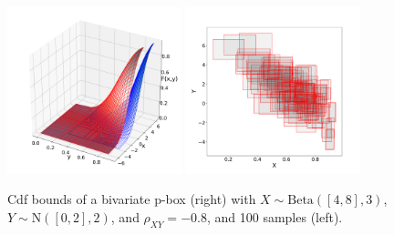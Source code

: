 \documentclass{juliacon}
\begin{document}
\begin{figure}[t!]
  \centering
  \includegraphics[width=0.45\textwidth]{../examples/JuliaCon/fig7/biv_cdf.pdf}\hfill
  \includegraphics[width=0.45\textwidth]{../examples/JuliaCon/fig7/samples.pdf}
  \caption{Cdf bounds of a bivariate p-box (right) with $X \sim \text{Beta}([4,8], 3)$, $Y \sim \text{N}([0,2], 2)$, and $\rho_{XY} = -0.8$, and 100 samples (left).}
  \label{fig:figure7}
\end{figure}
\end{document}
